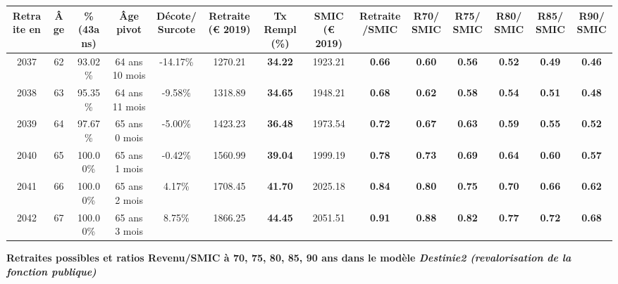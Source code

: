 \begin{adjustbox}{max width=\textwidth} 
\begin{tabular}[htb]{|c|c||c|c|c||c|c||c|c||c|c|c|c|c|} 
\hline 
 Retraite en &  Âge &  \%(43ans) &  Âge pivot &  Décote/Surcote &  Retraite (\euro{} 2019) &  Tx Rempl(\%) &  SMIC (\euro{} 2019) &  Retraite/SMIC &  R70/SMIC &  R75/SMIC &  R80/SMIC &  R85/SMIC &  R90/SMIC \\ 
\hline \hline 
 2037 &  62 &  93.02\% &  64 ans 10 mois &  -14.17\% &  1270.21 &  {\bf 34.22} &  1923.21 &  {\bf {\color{red} 0.66}} &  {\bf {\color{red} 0.60}} &  {\bf {\color{red} 0.56}} &  {\bf {\color{red} 0.52}} &  {\bf {\color{red} 0.49}} &  {\bf {\color{red} 0.46}} \\ 
\hline 
 2038 &  63 &  95.35\% &  64 ans 11 mois &  -9.58\% &  1318.89 &  {\bf 34.65} &  1948.21 &  {\bf {\color{red} 0.68}} &  {\bf {\color{red} 0.62}} &  {\bf {\color{red} 0.58}} &  {\bf {\color{red} 0.54}} &  {\bf {\color{red} 0.51}} &  {\bf {\color{red} 0.48}} \\ 
\hline 
 2039 &  64 &  97.67\% &  65 ans 0 mois &  -5.00\% &  1423.23 &  {\bf 36.48} &  1973.54 &  {\bf {\color{red} 0.72}} &  {\bf {\color{red} 0.67}} &  {\bf {\color{red} 0.63}} &  {\bf {\color{red} 0.59}} &  {\bf {\color{red} 0.55}} &  {\bf {\color{red} 0.52}} \\ 
\hline 
 2040 &  65 &  100.00\% &  65 ans 1 mois &  -0.42\% &  1560.99 &  {\bf 39.04} &  1999.19 &  {\bf {\color{red} 0.78}} &  {\bf {\color{red} 0.73}} &  {\bf {\color{red} 0.69}} &  {\bf {\color{red} 0.64}} &  {\bf {\color{red} 0.60}} &  {\bf {\color{red} 0.57}} \\ 
\hline 
 2041 &  66 &  100.00\% &  65 ans 2 mois &  4.17\% &  1708.45 &  {\bf 41.70} &  2025.18 &  {\bf {\color{red} 0.84}} &  {\bf {\color{red} 0.80}} &  {\bf {\color{red} 0.75}} &  {\bf {\color{red} 0.70}} &  {\bf {\color{red} 0.66}} &  {\bf {\color{red} 0.62}} \\ 
\hline 
 2042 &  67 &  100.00\% &  65 ans 3 mois &  8.75\% &  1866.25 &  {\bf 44.45} &  2051.51 &  {\bf {\color{red} 0.91}} &  {\bf {\color{red} 0.88}} &  {\bf {\color{red} 0.82}} &  {\bf {\color{red} 0.77}} &  {\bf {\color{red} 0.72}} &  {\bf {\color{red} 0.68}} \\ 
\hline 
\hline 
\end{tabular} 
\end{adjustbox} 
 
 \vspace{0.1cm} 
{\bf \noindent Retraites possibles et ratios Revenu/SMIC à 70, 75, 80, 85, 90 ans dans le modèle \emph{Destinie2 (revalorisation de la fonction publique)}}  
 
